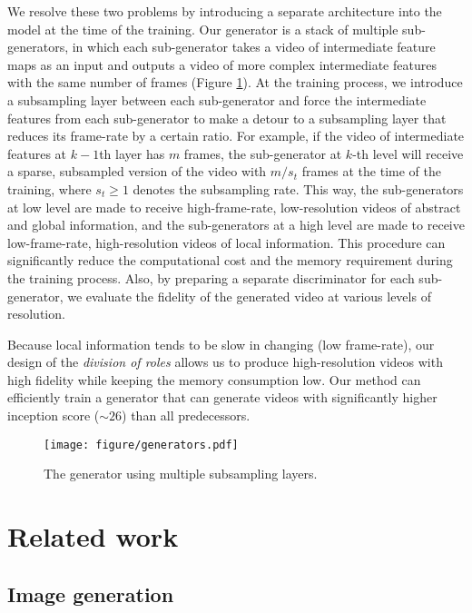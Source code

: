 \documentclass[twocolumn]{svjour3}
\def\Fig#1{Figure \ref{fig:#1}}
\begin{document}
We resolve these two problems by introducing a separate architecture into the model at the time of the training.
Our generator is a stack of multiple sub-generators, in which each sub-generator takes a video of intermediate feature maps as an input and outputs a video of more complex intermediate features with the same number of frames (\Fig{multigen}).
At the training process, we introduce a subsampling layer between each sub-generator and force the intermediate features from each sub-generator to make a detour to a subsampling layer that reduces its frame-rate by a certain ratio.
For example, if the video of intermediate features at $k-1$th layer has $m$ frames, the sub-generator at $k$-th level will receive a sparse, subsampled version of the video with $m / s_t$ frames at the time of the training, where $s_t \geq 1$ denotes the subsampling rate.
This way, the sub-generators at low level are made to receive high-frame-rate, low-resolution videos of abstract and global information, and the sub-generators at a high level are made to receive low-frame-rate, high-resolution videos of local information.
This procedure can significantly reduce the computational cost and the memory requirement during the training process.
Also, by preparing a separate discriminator for each sub-generator, we evaluate the fidelity of the generated video at various levels of resolution.

Because local information tends to be slow in changing (low frame-rate), our design of the {\em division of roles} allows us to produce high-resolution videos with high fidelity while keeping the memory consumption low.
Our method can efficiently train a generator that can generate videos with significantly higher inception score ($\sim 26$) than all predecessors.


\begin{figure}[t]
\centering
  \texttt{[image: figure/generators.pdf]}
  \caption{The generator using multiple subsampling layers.}
  \label{fig:multigen}

\end{figure}

\section{Related work}
\label{sec:related_work}

\subsection{Image generation}
\end{document}
